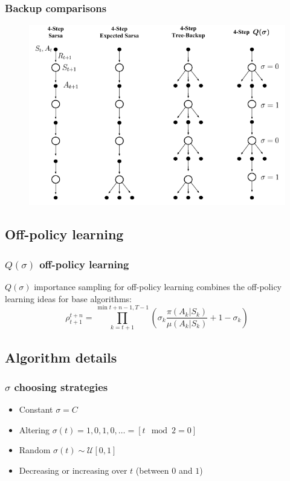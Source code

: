 \documentclass{beamer}
\begin{document}
\begin{frame}
  \frametitle{Backup comparisons}
  \begin{figure}
    \centering
    \includegraphics[width=0.7 \textwidth]{all-multi-step-backups}
  \end{figure}
\end{frame}

\subsection{Off-policy learning}

\begin{frame}
  \frametitle{$Q(\sigma)$ off-policy learning}
  $Q(\sigma)$ importance sampling for off-policy learning combines the
  off-policy learning ideas for base algorithms:
  $$\rho_{t + 1}^{t + n} = \prod_{k = t + 1}^{\min{t + n - 1, T - 1}}
    (\sigma_k \frac{\pi(A_k | S_k)}{\mu(A_k | S_k)} + 1 - \sigma_k)$$
\end{frame}

\subsection{Algorithm details}

\begin{frame}
  \frametitle{$\sigma$ choosing strategies}
  \begin{itemize}
    \item Constant $\sigma = C$
    \item Altering $\sigma(t) = 1, 0, 1, 0, \ldots = [t \mod 2 = 0]$
    \item Random $\sigma(t) \sim \mathcal{U}[0, 1]$
    \item Decreasing or increasing over $t$ (between $0$ and $1$)
  \end{itemize}
\end{frame}
\end{document}
